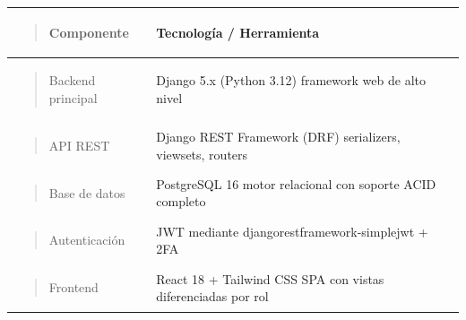 \documentclass[
]{article}
\newcounter{none} %
\begin{document}
{\def\LTcaptype{none} %
\begin{longtable}[]{@{}
  >{\raggedright\arraybackslash}p{}
  >{\raggedright\arraybackslash}p{}@{}}
\toprule\noalign{}
\begin{minipage}[b]{\linewidth}\raggedright
\begin{quote}
Componente
\end{quote}
\end{minipage} & \begin{minipage}[b]{\linewidth}\raggedright
Tecnología / Herramienta
\end{minipage} \\
\midrule\noalign{}
\endhead
\bottomrule\noalign{}
\endlastfoot
\begin{minipage}[t]{\linewidth}\raggedright
\begin{quote}
Backend principal
\end{quote}
\end{minipage} & Django 5.x (Python 3.12) framework web de alto nivel \\
\begin{minipage}[t]{\linewidth}\raggedright
\begin{quote}
API REST
\end{quote}
\end{minipage} & Django REST Framework (DRF) serializers, viewsets,
routers \\
\begin{minipage}[t]{\linewidth}\raggedright
\begin{quote}
Base de datos
\end{quote}
\end{minipage} & PostgreSQL 16 motor relacional con soporte ACID
completo \\
\begin{minipage}[t]{\linewidth}\raggedright
\begin{quote}
Autenticación
\end{quote}
\end{minipage} & JWT mediante djangorestframework-simplejwt + 2FA \\
\begin{minipage}[t]{\linewidth}\raggedright
\begin{quote}
Frontend
\end{quote}
\end{minipage} & React 18 + Tailwind CSS SPA con vistas diferenciadas
por rol \\

\end{longtable}}
\end{document}
